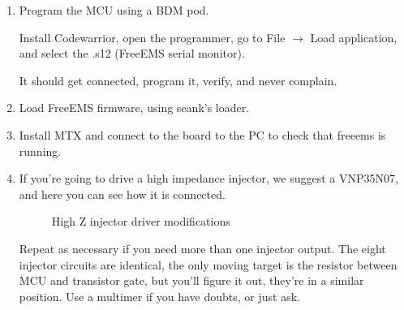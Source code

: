 \documentclass[12pt,a4paper,titlepage]{article}
\begin{document}
\begin{enumerate}
\item Program the MCU using a BDM pod.

Install Codewarrior, open the programmer, go to File $\rightarrow$ Load application, and select the .s12 (FreeEMS serial monitor).

It should get connected, program it, verify, and never complain.

\item Load FreeEMS firmware, using seank's loader.

\item Install MTX and connect to the board to the PC to check that freeems is running.

\item If you're going to drive a high impedance injector, we suggest a VNP35N07, and here you can see how it is connected.

\begin{figure}[htb]
  \centering
  \caption{High Z injector driver modifications}
\end{figure}


Repeat as necessary if you need more than one injector output. The eight injector circuits are identical, the only moving target is the resistor between MCU and transistor gate, but you'll figure it out, they're in a similar position. Use a multimer if you have doubts, or just ask.


\end{enumerate}
\end{document}
